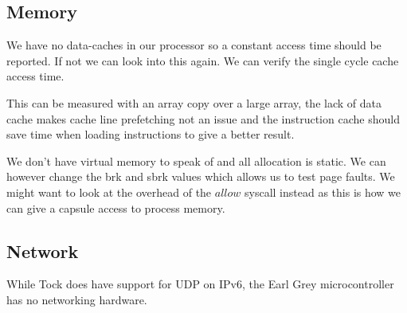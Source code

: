 \documentclass{article}
\begin{document}
\subsection{Memory}

We have no data-caches in our processor so a constant access time should be reported. If not we can look into this again. We can verify the single cycle cache access time.
    
This can be measured with an array copy over a large array, the lack of data cache makes cache line prefetching not an issue and the instruction cache should save time when loading instructions to give a better result.

We don't have virtual memory to speak of and all allocation is static. We can however change the brk and sbrk values which allows us to test page faults. We might want to look at the overhead of the $allow$ syscall instead as this is how we can give a capsule access to process memory.

\subsection{Network}

While Tock does have support for UDP on IPv6, the Earl Grey microcontroller has no networking hardware.
\end{document}
